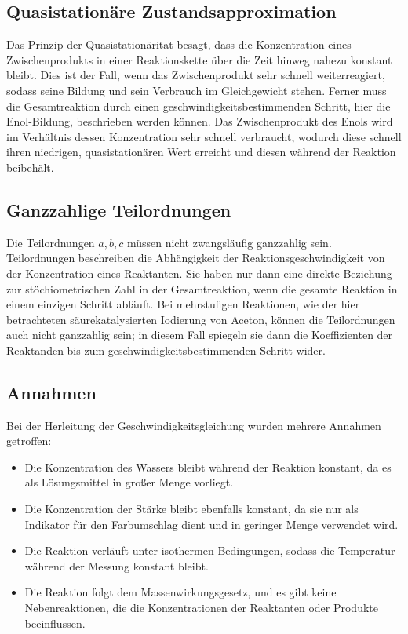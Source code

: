 \subsection{Quasistationäre Zustandsapproximation}
Das Prinzip der Quasistationäritat besagt, dass die Konzentration eines Zwischenprodukts in einer Reaktionskette über die Zeit hinweg nahezu konstant bleibt.\autocite{skript-k3}
Dies ist der Fall, wenn das Zwischenprodukt sehr schnell weiterreagiert, sodass seine Bildung und sein Verbrauch im Gleichgewicht stehen.
Ferner muss die Gesamtreaktion durch einen geschwindigkeitsbestimmenden Schritt, hier die Enol-Bildung, beschrieben werden können.\autocite{atkins2013physikalische}
Das Zwischenprodukt des Enols wird im Verhältnis dessen Konzentration sehr schnell verbraucht, wodurch diese schnell ihren niedrigen, quasistationären Wert erreicht und diesen während der Reaktion beibehält.

\subsection{Ganzzahlige Teilordnungen}
Die Teilordnungen $a, b, c$ müssen nicht zwangsläufig ganzzahlig sein.
Teilordnungen beschreiben die Abhängigkeit der Reaktionsgeschwindigkeit von der Konzentration eines Reaktanten.
Sie haben nur dann eine direkte Beziehung zur stöchiometrischen Zahl in der Gesamtreaktion, wenn die gesamte Reaktion in einem einzigen Schritt abläuft.\autocite{Lechner2018-lb}
Bei mehrstufigen Reaktionen, wie der hier betrachteten säurekatalysierten Iodierung von Aceton, können die Teilordnungen auch nicht ganzzahlig sein; in diesem Fall spiegeln sie dann die Koeffizienten der Reaktanden bis zum geschwindigkeitsbestimmenden Schritt wider.

\subsection{Annahmen}
Bei der Herleitung der Geschwindigkeitsgleichung wurden mehrere Annahmen getroffen:
\begin{itemize}
    \item Die Konzentration des Wassers bleibt während der Reaktion konstant, da es als Lösungsmittel in großer Menge vorliegt.
    \item Die Konzentration der Stärke bleibt ebenfalls konstant, da sie nur als Indikator für den Farbumschlag dient und in geringer Menge verwendet wird.
    \item Die Reaktion verläuft unter isothermen Bedingungen, sodass die Temperatur während der Messung konstant bleibt.
    \item Die Reaktion folgt dem Massenwirkungsgesetz, und es gibt keine Nebenreaktionen, die die Konzentrationen der Reaktanten oder Produkte beeinflussen.
\end{itemize}


